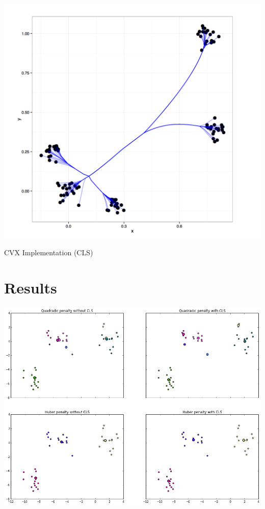 \documentclass[12pt]{beamer}
\begin{document}
\begin{frame}
	\begin{center}
		\vspace{-1 mm}
		\includegraphics[scale=0.35]{../figures/Clustering_Example.png}
	\end{center}
\end{frame}


\begin{frame}{CVX Implementation (CLS)}
	
\end{frame}



\section{Results}
\begin{frame}
	\begin{center}
		\vspace{-1 mm}
		\includegraphics[scale=0.33]{../figures/experiment2.png}
	\end{center}
	
\end{frame}
\end{document}
